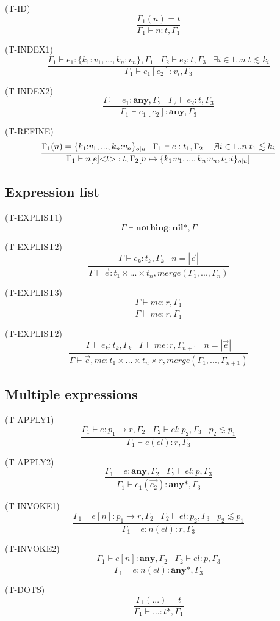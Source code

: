 \documentclass{paper}
\newcommand{\Any}{\mathbf{any}}
\newcommand{\Nil}{\mathbf{nil}}
\newcommand{\mylabel}[1]{\; (\textsc{#1})}
\newcommand{\env}{\Gamma}
\begin{document}
\noindent

\mylabel{T-ID}
\[
\dfrac{\env_{1}(n) = t}
      {\env_{1} \vdash n:t, \env_{1}}
\]

\mylabel{T-INDEX1}
\[
\dfrac{\env_{1} \vdash e_{1}:\{k_{1}{:}v_{1}, ..., k_{n}{:}v_{n}\}, \env_{1} \;\;\;
       \env_{2} \vdash e_{2}:t, \env_{3} \;\;\;
       \exists i \in 1{..}n \; t \lesssim k_{i}}
      {\env_{1} \vdash e_{1}[e_{2}]:v_{i}, \env_{3}}
\]

\mylabel{T-INDEX2}
\[
\dfrac{\env_{1} \vdash e_{1}:\Any, \env_{2} \;\;\;
       \env_{2} \vdash e_{2}:t, \env_{3}}
      {\env_{1} \vdash e_{1}[e_{2}]:\Any, \env_{3}}
\]

\mylabel{T-REFINE}
\[
\dfrac{\env_{1}(n) = \{ k_{1}{:}v_{1}, ..., k_{n}{:}v_{n} \}_{o|u} \;\;\;
       \env_{1} \vdash e:t_{1}, \env_{2} \;\;\;
       \not \exists i \in 1..n \; t_{1} \lesssim k_{i}}
      {\env_{1} \vdash n[e] {<}t{>}:t, \env_{2}[n \mapsto \{ k_{1}{:}v_{1}, ..., k_{n}{:}v_{n}, t_{1}{:}t\}_{o|u}]}
\]

\subsection{Expression list}

\noindent

\mylabel{T-EXPLIST1}
\[
\env \vdash \mathbf{nothing}:\Nil{*}, \env
\]

\mylabel{T-EXPLIST2}
\[
\dfrac{\env \vdash e_{k}:t_{k}, \env_{k} \;\;\;
       n = |\vec{e}|}
      {\env \vdash \vec{e}:t_{1} \times ... \times t_{n}, merge(\env_{1}, ..., \env_{n})}
\]

\mylabel{T-EXPLIST3}
\[
\dfrac{\env \vdash me:r, \env_{1}}
      {\env \vdash me:r, \env_{1}}
\]

\mylabel{T-EXPLIST2}
\[
\dfrac{\env \vdash e_{k}:t_{k}, \env_{k} \;\;\;
       \env \vdash me:r, \env_{n + 1} \;\;\;
       n = |\vec{e}|}
      {\env \vdash \vec{e}, me:t_{1} \times ... \times t_{n} \times r, merge(\env_{1}, ..., \env_{n+1})}
\]

\subsection{Multiple expressions}

\noindent

\mylabel{T-APPLY1}
\[
\dfrac{\env_{1} \vdash e:p_{1} \rightarrow r, \env_{2} \;\;\;
       \env_{2} \vdash el:p_{2}, \env_{3} \;\;\;
       p_{2} \lesssim p_{1}}
      {\env_{1} \vdash e(el):r, \env_{3}}
\]

\mylabel{T-APPLY2}
\[
\dfrac{\env_{1} \vdash e:\Any, \env_{2} \;\;\;
       \env_{2} \vdash el:p, \env_{3}}
      {\env_{1} \vdash e_{1}(\vec{e_{2}}):\Any{*}, \env_{3}}
\]

\mylabel{T-INVOKE1}
\[
\dfrac{\env_{1} \vdash e[n]:p_{1} \rightarrow r, \env_{2} \;\;\;
       \env_{2} \vdash el:p_{2}, \env_{3} \;\;\;
       p_{2} \lesssim p_{1}}
      {\env_{1} \vdash e{:}n(el):r, \env_{3}}
\]

\mylabel{T-INVOKE2}
\[
\dfrac{\env_{1} \vdash e[n]:\Any, \env_{2} \;\;\;
       \env_{2} \vdash el:p, \env_{3}}
      {\env_{1} \vdash e{:}n(el):\Any{*}, \env_{3}}
\]

\mylabel{T-DOTS}
\[
\dfrac{\env_{1}({...}) = t}
      {\env_{1} \vdash {...}:t{*}, \env_{1}}
\]
\end{document}

